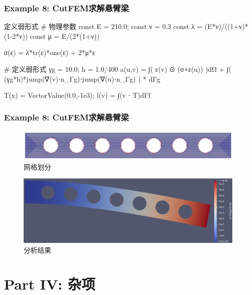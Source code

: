 \documentclass[lang=en,aspectratio=43,theme=default,logo=on]{simplebeamer}
\begin{document}
\begin{frame}[fragile]
    \frametitle{Example 8: CutFEM求解悬臂梁}
\begin{codex}{15}{定义弱形式}
# 物理参数
const E = 210.0; const ν = 0.3
const λ = (E*ν)/((1+ν)*(1-2*ν))
const μ = E/(2*(1+ν))

σ(ε) = λ*tr(ε)*one(ε) + 2*μ*ε

# 定义弱形式
γg = 10.0; h = 1.0/400
a(u,v) = ∫( ε(v) ⊙ (σ∘ε(u)) )dΩ + ∫( (γg*h)*jump(∇(v)⋅n_Γg)⋅jump(∇(u)⋅n_Γg) ) * dΓg

T(x) = VectorValue(0.0,-1e3);
l(v) = ∫(v ⋅ T)dΓf
\end{codex}
\end{frame}

\begin{frame}[fragile]
    \frametitle{Example 8: CutFEM求解悬臂梁}
    \begin{figure}
        \centering %
        \includegraphics[width=1\textwidth]{./img/025.png}
        \caption{网格划分}
    \end{figure}
    \begin{figure}
        \centering %
        \includegraphics[width=1\textwidth]{./img/024.png}
        \caption{分析结果}
    \end{figure}
\end{frame}

\section{Part IV: 杂项}
\end{document}
